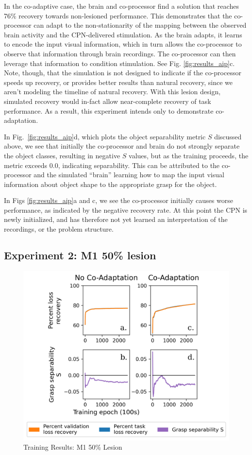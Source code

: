 \documentclass[12pt]{iopart}
\begin{document}
In the co-adaptive case, the brain and co-processor find a solution that reaches 76\% recovery towards non-lesioned
performance. This demonstrates that the co-processor can adapt to the non-stationarity
of the mapping between the observed brain activity and the CPN-delivered stimulation.
As the brain adapts, it learns to encode the input visual information, which in turn allows the co-processor
to observe that information through brain recordings. The co-processor can then leverage that information to condition
stimulation. See Fig. \ref{fig:results_aip}c. Note, though, that the simulation is not designed to indicate if
the co-processor speeds up recovery, or provides better results than natural recovery, since we aren't modeling the
timeline of natural recovery. With this lesion design, simulated recovery would in-fact allow near-complete recovery
of task performance. As a result, this experiment intends only to demonstrate co-adaptation.

In Fig.~\ref{fig:results_aip}d, which plots the object separability metric $S$ discussed above, we see that initially
the co-processor and brain do not strongly separate the object classes, resulting in negative $S$ values, but as the
training proceeds, the metric exceeds 0.0, indicating separability. This can be attributed to the co-processor and the
simulated ``brain'' learning how to map the input visual information about object shape to the appropriate grasp for the object.

In Figs \ref{fig:results_aip}a and c, we see the co-processor initially causes worse performance, as
indicated by the negative recovery rate. At this point the CPN is newly initialized, and has therefore
not yet learned an interpretation of the recordings, or the problem structure.

\subsection{Experiment 2: M1 50\% lesion}
\begin{figure}[h]
\centering
\includegraphics[scale=1.3]{training_results_m1.png}
\caption{Training Results: M1 50\% Lesion}
\label{fig:results_m1}
\end{figure}
\end{document}
